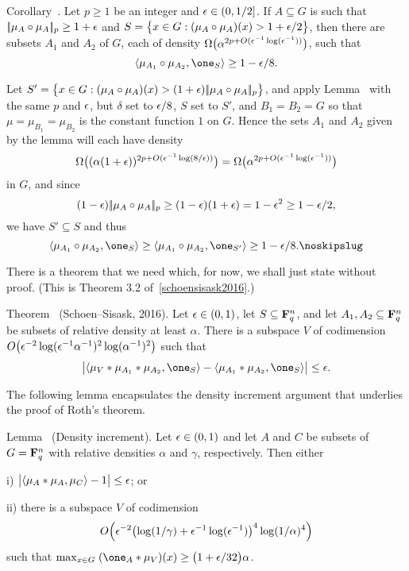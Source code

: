 \edef\deprandcorollary{\the\thmcount}
\proclaim Corollary~{\advthm}. Let $p\ge 1$ be an integer and $\epsilon\in (0,1/2]$. If $A\subseteq G$ is such that
$|\!|\mu_A\circ\mu_A|\!|_p \ge 1+\epsilon$ and
$S = \bigl\{x\in G: (\mu_A\circ\mu_A)(x) > 1+\epsilon/2\bigr\}$, then there are
subsets $A_1$ and $A_2$ of $G$, each of density $\Omega\bigl( \alpha^{2p+O(\epsilon^{-1}\log(\epsilon^{-1}))}\bigr)$,
such that
$$\langle \mu_{A_1}\circ\mu_{A_2}, \one_S\rangle \ge 1-\eps/8.$$

\proof Let $S' = \bigl\{x\in G : (\mu_A\circ\mu_A)(x) > (1+\epsilon)|\!|\mu_A\circ\mu_A|\!|_p\bigr\}$, and apply
Lemma~{\dependentrandom} with the same $p$ and $\epsilon$, but $\delta$ set to $\epsilon/8$, $S$ set to $S'$,
and $B_1 = B_2 = G$ so that $\mu = \mu_{B_1} = \mu_{B_2}$ is the constant function $1$ on $G$. Hence the
sets $A_1$ and $A_2$ given by the lemma will each have density
$$\Omega\bigl((\alpha(1+\epsilon))^{2p+O(\epsilon^{-1}\log(8/\epsilon))}\bigr)
=\Omega\bigl(\alpha^{2p+O(\epsilon^{-1}\log(\epsilon^{-1}))}\bigr)$$
in $G$, and since
$$(1-\epsilon)|\!|\mu_A\circ\mu_A|\!|_p \ge (1-\epsilon)(1+\epsilon) = 1-\epsilon^2 \ge 1-\epsilon/2,$$
we have $S'\subseteq S$ and thus
$$\langle \mu_{A_1}\circ\mu_{A_2}, \one_S\rangle \ge
\langle \mu_{A_1}\circ\mu_{A_2}, \one_{S'}\rangle \ge 1-\eps/8.\noskipslug$$

There is a theorem that we need which, for now, we shall just state without proof. (This is Theorem 3.2
of~\ref{schoensisask2016}.)

\edef\almostperiodicity{\the\thmcount}
\parenproclaim Theorem~{\advthm} (Schoen--Sisask, {\rm 2016}).
Let $\epsilon\in (0,1)$, let $S\subseteq {\bf F}_q^n$, and
let $A_1,A_2\subseteq {\bf F}_q^n$ be subsets
of relative density at least $\alpha$. There is a subspace $V$ of codimension
$O\bigl(\epsilon^{-2}\log(\epsilon^{-1}\alpha^{-1})^2\log(\alpha^{-1})^2\bigr)$
such that
$$\bigl| \langle \mu_V*\mu_{A_1}*\mu_{A_2}, \one_S\rangle -
 \langle \mu_{A_1}*\mu_{A_2}, \one_S\rangle\bigr| \le \eps.$$

The following lemma encapsulates the density increment argument that underlies the proof of Roth's theorem.

\edef\densityincrement{\the\thmcount}
\parenproclaim Lemma~{\advthm} (Density increment). Let $\epsilon\in (0,1)$ and let $A$ and $C$
be subsets of $G ={\bf F}_q^n$ with relative densities $\alpha$ and $\gamma$, respectively. Then either
\medskip
\item{i)} $\bigl|\langle \mu_A*\mu_A,\mu_C\rangle-1\bigr| \le \epsilon$; or
\smallskip
\item{ii)} there is a subspace $V$ of codimension
$$O\Bigl(\epsilon^{-2}\bigl(\log(1/\gamma)+\epsilon^{-1}\log(\epsilon^{-1})\bigr)^4\log(1/\alpha)^4\Bigr)$$
such that $\max_{x\in G}\;(\one_A*\mu_V)(x) \ge \bigl(1+\eps/32\bigr)\alpha$.
\medskip

